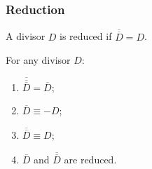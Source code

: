 \documentclass{beamer}
\newcommand{\pid}[1]{\left\langle #1 \right\rangle}
\renewcommand{\bar}{\overline}
\begin{document}

\begin{frame}
\frametitle{Reduction}
  \begin{definition}
    A divisor $D$ is reduced if $\bar{\bar D} = D$.
  \end{definition}
  \begin{theorem}
    For any divisor $D$:
    \begin{enumerate}
      \item $\bar{\bar{\bar D}} = \bar D$;
      \item $\bar D \equiv -D$;
      \item $\bar{\bar D} \equiv D$;
      \item $\bar D$ and $\bar{\bar D}$ are reduced.
    \end{enumerate}
  \end{theorem}
\end{frame}
\end{document}
